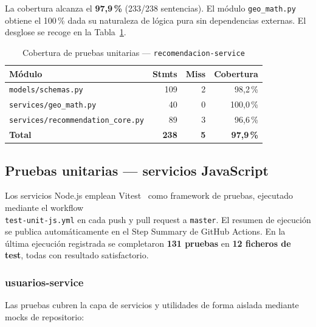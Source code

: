 La cobertura alcanza el \textbf{97,9\,\%} (233/238 sentencias). El módulo \texttt{geo\_math.py}
obtiene el 100\,\% dada su naturaleza de lógica pura sin dependencias externas. El desglose se
recoge en la Tabla~\ref{tab:coverage-recomendacion}.

\begin{table}[H]
  \centering
  \caption{Cobertura de pruebas unitarias — \texttt{recomendacion-service}}
  \label{tab:coverage-recomendacion}
  \begin{tabular}{lrrr}
    \toprule
    \textbf{Módulo}                           & \textbf{Stmts} & \textbf{Miss} & \textbf{Cobertura} \\
    \midrule
    \texttt{models/schemas.py}                & 109            & 2             & 98,2\,\%           \\
    \texttt{services/geo\_math.py}            & 40             & 0             & 100,0\,\%          \\
    \texttt{services/recommendation\_core.py} & 89             & 3             & 96,6\,\%           \\
    \midrule
    \textbf{Total}                            & \textbf{238}   & \textbf{5}    & \textbf{97,9\,\%}  \\
    \bottomrule
  \end{tabular}
\end{table}

\subsection{Pruebas unitarias — servicios JavaScript}
\label{sec:pruebas-unitarias-js}

Los servicios Node.js emplean Vitest~\cite{vitest} como framework de pruebas,
ejecutado mediante el workflow\\  \texttt{test-unit-js.yml} en cada push y pull request
a \texttt{master}. El resumen de ejecución se publica automáticamente en el Step Summary de
GitHub Actions. En la última ejecución registrada se completaron \textbf{131 pruebas} en
\textbf{12 ficheros de test}, todas con resultado satisfactorio.

\subsubsection{usuarios-service}

Las pruebas cubren la capa de servicios y utilidades de forma aislada mediante mocks de
repositorio:

